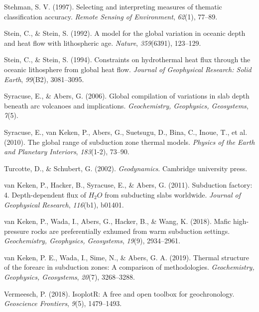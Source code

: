 \begin{CSLReferences}{1}{1}
\leavevmode{}%
Stehman, S. V. (1997). Selecting and interpreting measures of thematic classification accuracy. \emph{Remote Sensing of Environment}, \emph{62}(1), 77--89.

\leavevmode{}%
Stein, C., \& Stein, S. (1992). A model for the global variation in oceanic depth and heat flow with lithospheric age. \emph{Nature}, \emph{359}(6391), 123--129.

\leavevmode{}%
Stein, C., \& Stein, S. (1994). Constraints on hydrothermal heat flux through the oceanic lithosphere from global heat flow. \emph{Journal of Geophysical Research: Solid Earth}, \emph{99}(B2), 3081--3095.

\leavevmode{}%
Syracuse, E., \& Abers, G. (2006). Global compilation of variations in slab depth beneath arc volcanoes and implications. \emph{Geochemistry, Geophysics, Geosystems}, \emph{7}(5).

\leavevmode{}%
Syracuse, E., van Keken, P., Abers, G., Suetsugu, D., Bina, C., Inoue, T., et al. (2010). The global range of subduction zone thermal models. \emph{Physics of the Earth and Planetary Interiors}, \emph{183}(1-2), 73--90.

\leavevmode{}%
Turcotte, D., \& Schubert, G. (2002). \emph{Geodynamics}. Cambridge university press.

\leavevmode{}%
van Keken, P., Hacker, B., Syracuse, E., \& Abers, G. (2011). Subduction factory: 4. Depth-dependent flux of \(H_2O\) from subducting slabs worldwide. \emph{Journal of Geophysical Research}, \emph{116}(b1), b01401.

\leavevmode{}%
van Keken, P., Wada, I., Abers, G., Hacker, B., \& Wang, K. (2018). Mafic high-pressure rocks are preferentially exhumed from warm subduction settings. \emph{Geochemistry, Geophysics, Geosystems}, \emph{19}(9), 2934--2961.

\leavevmode{}%
van Keken, P. E., Wada, I., Sime, N., \& Abers, G. A. (2019). Thermal structure of the forearc in subduction zones: A comparison of methodologies. \emph{Geochemistry, Geophysics, Geosystems}, \emph{20}(7), 3268--3288.

\leavevmode{}%
Vermeesch, P. (2018). IsoplotR: A free and open toolbox for geochronology. \emph{Geoscience Frontiers}, \emph{9}(5), 1479--1493.


\end{CSLReferences}
